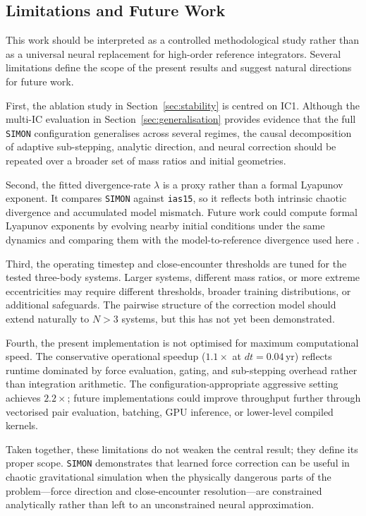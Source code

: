 \documentclass[12pt]{article}
\begin{document}
\subsection{Limitations and Future Work}
\label{sec:limitations}

This work should be interpreted as a controlled methodological study rather than as a
universal neural replacement for high-order reference integrators. Several limitations
define the scope of the present results and suggest natural directions for future work.

First, the ablation study in Section~\ref{sec:stability} is centred on IC1. Although the
multi-IC evaluation in Section~\ref{sec:generalisation} provides evidence that the full
\texttt{SIMON} configuration generalises across several regimes, the causal decomposition
of adaptive sub-stepping, analytic direction, and neural correction should be repeated over
a broader set of mass ratios and initial geometries.

Second, the fitted divergence-rate $\lambda$ is a proxy rather than a formal Lyapunov
exponent. It compares \texttt{SIMON} against \texttt{ias15}, so it reflects both intrinsic
chaotic divergence and accumulated model mismatch. Future work could compute formal
Lyapunov exponents by evolving nearby initial conditions under the same dynamics and
comparing them with the model-to-reference divergence used here \citep{sep-chaos}.

Third, the operating timestep and close-encounter thresholds are tuned for the tested
three-body systems. Larger systems, different mass ratios, or more extreme eccentricities
may require different thresholds, broader training distributions, or additional safeguards.
The pairwise structure of the correction model should extend naturally to $N>3$ systems,
but this has not yet been demonstrated.

Fourth, the present implementation is not optimised for maximum computational
speed. The conservative operational speedup ($1.1\times$ at $dt=0.04$\,yr)
reflects runtime dominated by force evaluation, gating, and sub-stepping
overhead rather than integration arithmetic. The configuration-appropriate
aggressive setting achieves $2.2\times$; future implementations could improve
throughput further through vectorised pair evaluation, batching, GPU inference,
or lower-level compiled kernels.

Taken together, these limitations do not weaken the central result; they define its proper
scope. \texttt{SIMON} demonstrates that learned force correction can be useful in chaotic
gravitational simulation when the physically dangerous parts of the problem---force
direction and close-encounter resolution---are constrained analytically rather than left
to an unconstrained neural approximation.

\newpage




\end{document}
